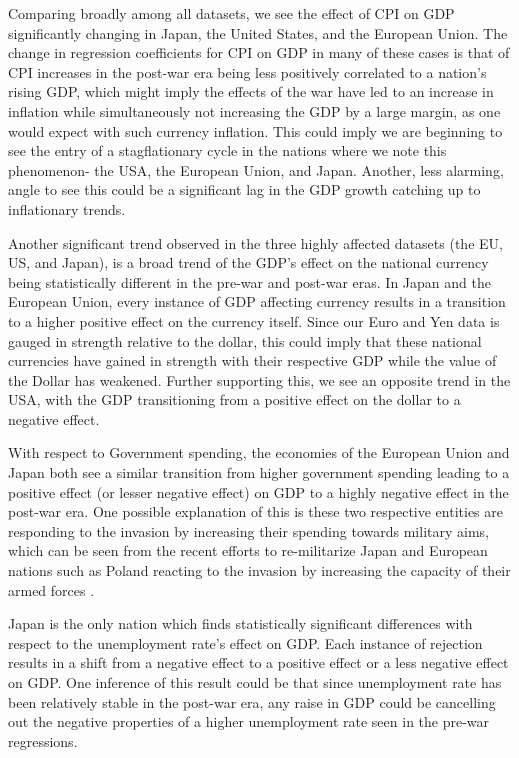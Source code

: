 \documentclass[11pt,regno]{amsart}
\theoremstyle{plain}
\numberwithin{equation}{section}
\begin{document}
Comparing broadly among all datasets, we see the effect of CPI on GDP significantly changing in Japan, the United States, and the European Union. The change in regression coefficients for CPI on GDP in many of these cases is that of CPI increases in the post-war era being less positively correlated to a nation's rising GDP, which might imply the effects of the war have led to an increase in inflation while simultaneously not increasing the GDP by a large margin, as one would expect with such currency inflation. This could imply we are beginning to see the entry of a stagflationary cycle in the nations where we note this phenomenon- the USA, the European Union, and Japan. Another, less alarming, angle to see this could be a significant lag in the GDP growth catching up to inflationary trends.

Another significant trend observed in the three highly affected datasets (the EU, US, and Japan), is a broad trend of the GDP's effect on the national currency being statistically different in the pre-war and post-war eras. In Japan and the European Union, every instance of GDP affecting currency results in a transition to a higher positive effect on the currency itself. Since our Euro and Yen data is gauged in strength relative to the dollar, this could imply that these national currencies have gained in strength with their respective GDP while the value of the Dollar has weakened. Further supporting this, we see an opposite trend in the USA, with the GDP transitioning from a positive effect on the dollar to a negative effect.



With respect to Government spending, the economies of the European Union and Japan both see a similar transition from higher government spending leading to a positive effect (or lesser negative effect) on GDP to a highly negative effect in the post-war era. One possible explanation of this is these two respective entities are responding to the invasion by increasing their spending towards military aims, which can be seen from the recent efforts to re-militarize Japan \cite{japan_war} and European nations such as Poland reacting to the invasion by increasing the capacity of their armed forces \cite{poland}.  

Japan is the only nation which finds statistically significant differences with respect to the unemployment rate's effect on GDP. Each instance of rejection results in a shift from a negative effect to a positive effect or a less negative effect on GDP. One inference of this result could be that since unemployment rate has been relatively stable in the post-war era, any raise in GDP could be cancelling out the negative properties of a higher unemployment rate seen in the pre-war regressions. 
\end{document}
